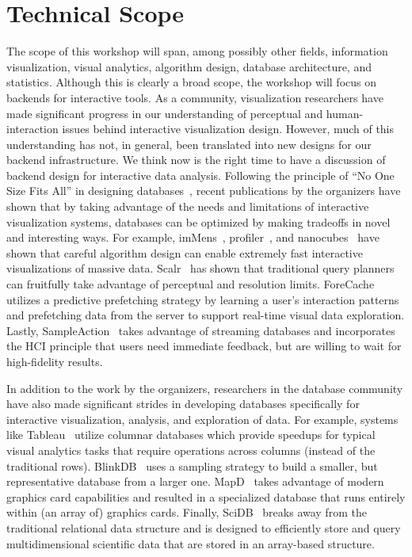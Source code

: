 \documentclass[journal]{vgtc}                %
\begin{document}
\section{Technical Scope}
The scope of this workshop will span, among possibly other fields, information visualization, visual analytics, algorithm design, database architecture, and statistics. 
Although this is clearly a broad scope, the workshop will focus on backends for interactive tools. 
As a community, visualization researchers have made significant progress in our understanding of perceptual and human-interaction issues behind interactive visualization design. 
However, much of this understanding has not, in general, been translated into new designs for our backend infrastructure. 
We think now is the right time to have a discussion of backend design for interactive data analysis. 
Following the principle of ``No One Size Fits All'' in designing databases~, recent publications by the organizers have shown that by taking advantage of the needs and limitations of interactive visualization systems, databases can be optimized by making tradeoffs in novel and interesting
ways. 
For example, imMens~, profiler~, and nanocubes~ have shown that careful algorithm design can enable extremely fast interactive visualizations of massive data. 
Scalr~ has shown that traditional query planners can fruitfully take advantage of perceptual and resolution limits. 
ForeCache~ utilizes a predictive prefetching strategy by learning a user's interaction patterns and prefetching data from the server to support real-time visual data exploration. 
Lastly, SampleAction~ takes advantage of streaming databases and
incorporates the HCI principle that users need immediate feedback, but are willing to wait for high-fidelity results.

In addition to the work by the organizers, researchers in the database community have also made significant strides in developing databases specifically for interactive visualization, analysis, and exploration
of data. 
For example, systems like Tableau~ utilize columnar databases which provide speedups for typical visual analytics tasks that require operations across columns (instead of the traditional rows). 
BlinkDB~ uses a sampling strategy to build a smaller, but representative database from a larger one. 
MapD~ takes advantage of modern graphics card capabilities and resulted in a specialized database that runs entirely within (an array of) graphics cards. 
Finally, SciDB~ breaks away from the traditional relational data structure and is designed to efficiently store and query multidimensional scientific data that are stored in an array-based structure. 
\end{document}
